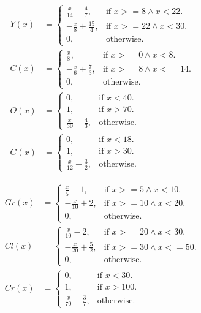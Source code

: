 \documentclass[a4paper]{scrartcl}
\begin{document}
\begin{align*}
 Y(x)&=\begin{cases}
     \frac{x}{14} - \frac{4}{7}, & \text{if $x>=8 \wedge x<22$}.\\
    -\frac{x}{8}+\frac{15}{4}, & \text{if $x>=22 \wedge x<30$}. \\
    0, & \text{otherwise}.
    \end{cases} \\
 C(x)&=\begin{cases}
    \frac{x}{8}, & \text{if $x>=0 \wedge x<8$}.\\
    -\frac{x}{6}+\frac{7}{3}, & \text{if $x>=8 \wedge x<=14$}. \\
    0, & \text{otherwise}.
  \end{cases} \\
  O(x)&=\begin{cases}
    0, & \text{if $x<40$}.\\
    1, & \text{if $x>70$}. \\
    \frac{x}{30}-\frac{4}{3}, & \text{otherwise}.
    \end{cases}\\
 G(x)&=\begin{cases}
    0, & \text{if $x<18$}.\\
    1, & \text{if $x>30$}. \\
    \frac{x}{12}-\frac{3}{2}, & \text{otherwise}.
    \end{cases}
\end{align*}

\begin{align*}
 Gr(x)&=\begin{cases}
    \frac{x}{5}-1, & \text{if $x>=5 \wedge x<10$}.\\
    -\frac{x}{10}+2, & \text{if $x>=10 \wedge x<20$}. \\
    0, & \text{otherwise}.
    \end{cases} \\
 Cl(x)&=\begin{cases}
    \frac{x}{10}-2, & \text{if $x>=20 \wedge x<30$}.\\
    -\frac{x}{20}+\frac{5}{2}, & \text{if $x>=30 \wedge x<=50$}. \\
    0, & \text{otherwise}.
  \end{cases} \\
    Cr(x)&=\begin{cases}
        0, & \text{if $x<30$}.\\
        1, & \text{if $x>100$}. \\
        \frac{x}{70}-\frac{3}{7}, & \text{otherwise}.
    \end{cases}
\end{align*}
\end{document}
